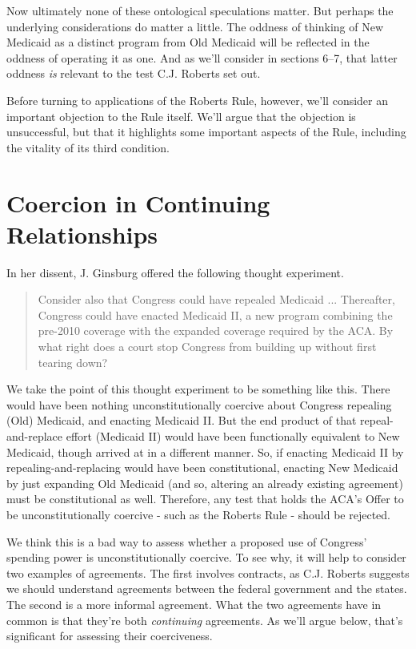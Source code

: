 \documentclass[
  11pt,
  letterpaper,
  DIV=11,
  numbers=noendperiod,
  oneside]{scrartcl}
\begin{document}
Now ultimately none of these ontological speculations matter. But
perhaps the underlying considerations do matter a little. The oddness of
thinking of New Medicaid as a distinct program from Old Medicaid will be
reflected in the oddness of operating it as one. And as we'll consider
in sections 6--7, that latter oddness \emph{is} relevant to the test
C.J. Roberts set out.

Before turning to applications of the Roberts Rule, however, we'll
consider an important objection to the Rule itself. We'll argue that the
objection is unsuccessful, but that it highlights some important aspects
of the Rule, including the vitality of its third condition.

\section{Coercion in Continuing
Relationships}\label{coercion-in-continuing-relationships}

In her dissent, J. Ginsburg offered the following thought experiment.

\begin{quote}
Consider also that Congress could have repealed Medicaid ... Thereafter,
Congress could have enacted Medicaid II, a new program combining the
pre-2010 coverage with the expanded coverage required by the ACA. By
what right does a court stop Congress from building up without first
tearing down?
\end{quote}

We take the point of this thought experiment to be something like this.
There would have been nothing unconstitutionally coercive about Congress
repealing (Old) Medicaid, and enacting Medicaid II. But the end product
of that repeal-and-replace effort (Medicaid II) would have been
functionally equivalent to New Medicaid, though arrived at in a
different manner. So, if enacting Medicaid II by repealing-and-replacing
would have been constitutional, enacting New Medicaid by just expanding
Old Medicaid (and so, altering an already existing agreement) must be
constitutional as well. Therefore, any test that holds the ACA's Offer
to be unconstitutionally coercive - such as the Roberts Rule - should be
rejected.

We think this is a bad way to assess whether a proposed use of Congress'
spending power is unconstitutionally coercive. To see why, it will help
to consider two examples of agreements. The first involves contracts, as
C.J. Roberts suggests we should understand agreements between the
federal government and the states. The second is a more informal
agreement. What the two agreements have in common is that they're both
\emph{continuing} agreements. As we'll argue below, that's significant
for assessing their coerciveness.
\end{document}
